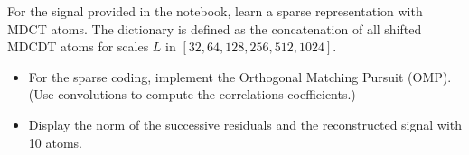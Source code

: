 \documentclass[11pt]{article}
\begin{document}
\begin{exercise}[subtitle=Sparse coding with OMP]
For the signal provided in the notebook, learn a sparse representation with MDCT atoms.
The dictionary is defined as the concatenation of all shifted MDCDT atoms for scales $L$ in $[32, 64, 128, 256, 512, 1024]$.

\begin{itemize}
    \item For the sparse coding, implement the Orthogonal Matching Pursuit (OMP). (Use convolutions to compute the correlations coefficients.)
    \item Display the norm of the successive residuals and the reconstructed signal with 10 atoms.
\end{itemize}

 \end{exercise}
\end{document}
